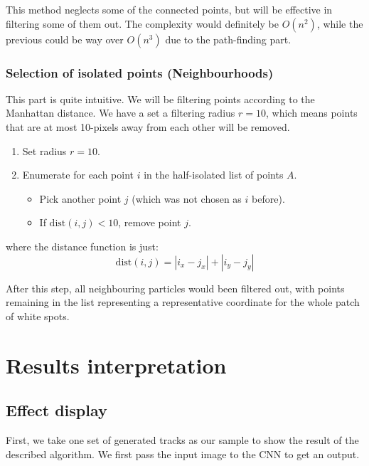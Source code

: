 \documentclass[11pt,a4paper]{scrartcl}
\begin{document}
This method neglects some of the connected points, but will be effective in filtering some of them out. The complexity would definitely be $O(n^2)$, while the previous could be way over $O(n^3)$ due to the path-finding part.

\subsubsection{Selection of isolated points (Neighbourhoods)}

This part is quite intuitive. We will be filtering points according to the Manhattan distance. We have a set a filtering radius $r = 10$, which means points that are at most 10-pixels away from each other will be removed.

\begin{enumerate}
    \item Set radius $r = 10$.
    \item Enumerate for each point $i$ in the half-isolated list of points $A$.
    \begin{itemize}
        \item Pick another point $j$ (which was not chosen as $i$ before).
        \item If $\text{dist}(i,j) < 10$, remove point $j$.
    \end{itemize}
\end{enumerate}
where the distance function is just:
$$\text{dist}(i,j) = \left| i_x - j_x \right| + \left| i_y - j_y \right|$$

After this step, all neighbouring particles would been filtered out, with points remaining in the list representing a representative coordinate for the whole patch of white spots.


\section{Results interpretation}

\subsection{Effect display}

First, we take one set of generated tracks as our sample to show the result of the described algorithm. We first pass the input image to the CNN to get an output.
\end{document}
